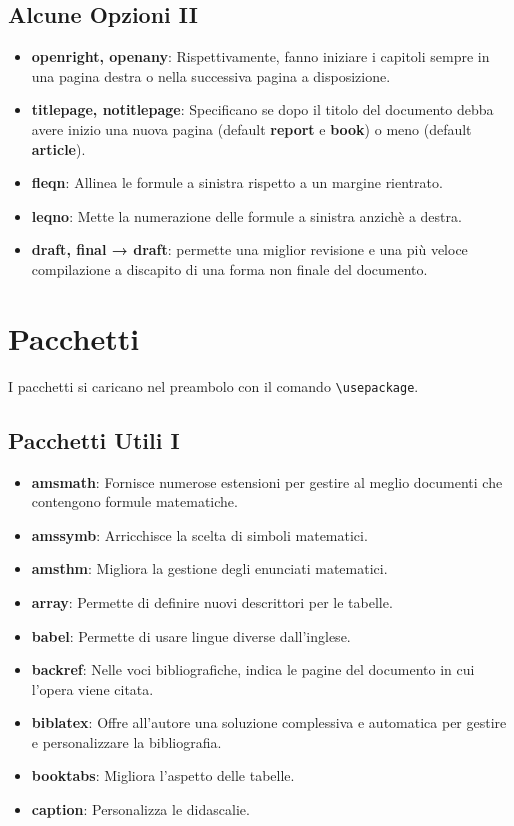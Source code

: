 \documentclass{report}
\begin{document}
            \subsection{Alcune Opzioni II}
                \begin{itemize}
                    \item \textbf{openright, openany}: Rispettivamente, fanno iniziare i capitoli sempre in una pagina destra o nella successiva pagina a disposizione.
                    \item \textbf{titlepage, notitlepage}: Specificano se dopo il titolo del documento debba avere inizio una nuova pagina (default \textbf{report} e \textbf{book}) o meno (default \textbf{article}).
                    \item \textbf{fleqn}: Allinea le formule a sinistra rispetto a un margine rientrato.
                    \item \textbf{leqno}: Mette la numerazione delle formule a sinistra anzichè a destra.
                    \item \textbf{draft, final → draft}: permette una miglior revisione e una più veloce compilazione a discapito di una forma non finale del documento.
                \end{itemize}

        \section{Pacchetti}
            I pacchetti si caricano nel preambolo con il comando \verb!\usepackage!.

            \subsection{Pacchetti Utili I}
                \begin{itemize}
                    \item \textbf{amsmath}: Fornisce numerose estensioni per gestire al meglio documenti che contengono formule matematiche.
                    \item \textbf{amssymb}: Arricchisce la scelta di simboli matematici.
                    \item \textbf{amsthm}: Migliora la gestione degli enunciati matematici.
                    \item \textbf{array}: Permette di definire nuovi descrittori per le tabelle.
                    \item \textbf{babel}: Permette di usare lingue diverse dall'inglese.
                    \item \textbf{backref}: Nelle voci bibliografiche, indica le pagine del documento in cui l'opera viene citata.
                    \item \textbf{biblatex}: Offre all'autore una soluzione complessiva e automatica per gestire e personalizzare la bibliografia.
                    \item \textbf{booktabs}: Migliora l'aspetto delle tabelle.
                    \item \textbf{caption}: Personalizza le didascalie.
                \end{itemize}
\end{document}

